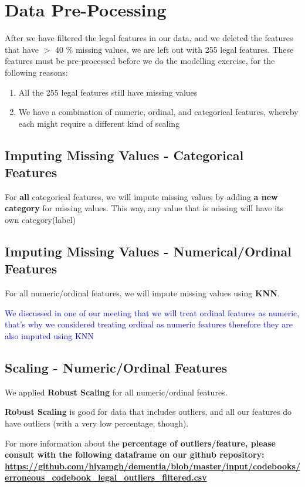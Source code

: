 \documentclass{article}
\begin{document}
\section{Data Pre-Pocessing}
After we have filtered the legal features in our data, and we deleted the features that have $>$ 40 \% missing values, we are left out with 255 legal features. These features must be pre-processed before we do the modelling exercise, for the following reasons:
\begin{enumerate}
\item All the 255 legal features still have missing values
\item We have a combination of numeric, ordinal, and categorical features, whereby each might require a different kind of scaling
\end{enumerate}

\subsection{Imputing Missing Values - Categorical Features}
For \textbf{all} categorical features, we will impute missing values by adding \textbf{a new category} for missing values. This way, any value that is missing will have its own category(label)

\subsection{Imputing Missing Values - Numerical/Ordinal Features}
For all numeric/ordinal features, we will impute missing values using \textbf{KNN}.

\noindent \textcolor{blue}{We discussed in one of our meeting that we will treat ordinal features as numeric, that's why we considered treating ordinal as numeric features therefore they are also imputed using KNN}

\subsection{Scaling - Numeric/Ordinal Features}
We applied \textbf{Robust Scaling} for all numeric/ordinal features.

\noindent \textbf{Robust Scaling} is good for data that includes outliers, and all our features do have outliers (with a very low percentage, though). 

\noindent For more information about the \textbf{percentage of outliers/feature, please consult with the following dataframe on our github repository: \url{https://github.com/hiyamgh/dementia/blob/master/input/codebooks/erroneous_codebook_legal_outliers_filtered.csv}}
\end{document}
